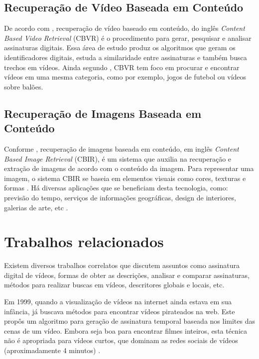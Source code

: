 \subsection{Recuperação de Vídeo Baseada em Conteúdo}
De acordo com \citeauthor{law2007video}, recuperação de vídeo baseado em conteúdo, do inglês \textit{Content Based Video Retrieval} (CBVR) é o procedimento para gerar, pesquisar e analisar assinaturas digitais. Essa área de estudo produz os algoritmos que geram os identificadores digitais, estuda a similaridade entre assinaturas e também busca trechos em vídeos. Ainda segundo \citeauthor{law2007video}, CBVR tem foco em procurar e encontrar vídeos em uma mesma categoria, como por exemplo, jogos de futebol ou vídeos sobre balões.

\subsection{Recuperação de Imagens Baseada em Conteúdo}
Conforme \citeauthor{gudivada1995content}, recuperação de imagens baseada em conteúdo, em inglês \textit{Content Based Image Retrieval} (CBIR), é um sistema que auxilia na recuperação e extração de imagens de acordo com o conteúdo da imagem. Para representar uma imagem, o sistema CBIR se baseia em elementos visuais como cores, texturas e formas \citeauthor{vikhar2016improved}. Há diversas aplicações que se beneficiam desta tecnologia, como: previsão do tempo, serviços de informações geográficas, design de interiores, galerias de arte, etc \citeauthor{gudivada1995content}.

\section{Trabalhos relacionados}
\label{chap:relacionados}


Existem diversos trabalhos correlatos que discutem assuntos como assinatura digital de vídeos, formas de obter as descrições, analisar e comparar assinaturas, métodos para realizar buscas em vídeos, descritores globais e locais, etc. 

Em 1999, quando a visualização de vídeos na internet ainda estava em sua infância, \citeauthor{indyk1999finding} já buscava métodos para encontrar vídeos pirateados na web. Este propôs um algoritmo para geração de assinatura temporal baseada nos limites das cenas de um vídeo. Embora seja boa para encontrar filmes inteiros, esta técnica não é apropriada para vídeos curtos, que dominam as redes sociais de vídeos (aproximadamente 4 minutos) \citeauthor{comscoreinc}.


